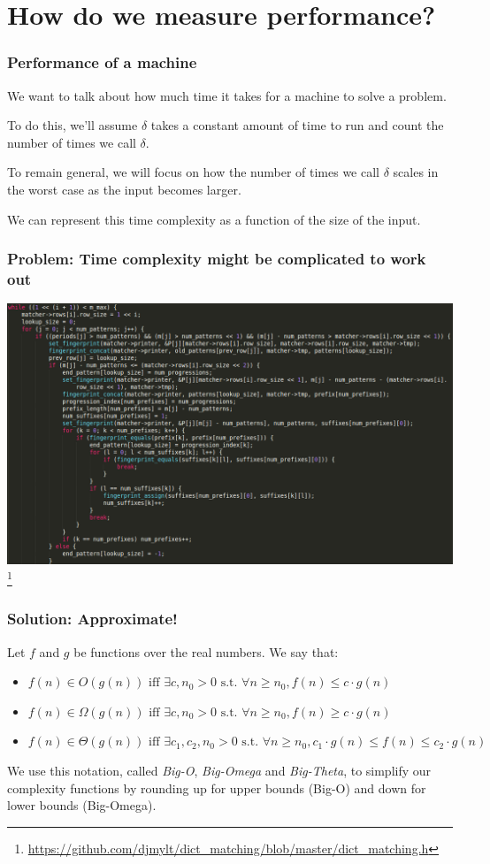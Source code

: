 \documentclass[aspectratio=169]{beamer}
\begin{document}
\section{How do we measure performance?}

\begin{frame}
\frametitle{Performance of a machine}
We want to talk about how much time it takes for a machine to solve a problem.

To do this, we'll assume $\delta$ takes a constant amount of time to run and count the number of times we call $\delta$.

To remain general, we will focus on how the number of times we call $\delta$ scales in the worst case as the input becomes larger.

We can represent this time complexity as a function of the size of the input.
\end{frame}

\begin{frame}
\frametitle{Problem: Time complexity might be complicated to work out}
\includegraphics[scale=0.25]{complex_code}\footnote{\url{https://github.com/djmylt/dict_matching/blob/master/dict_matching.h}}
\end{frame}

\begin{frame}
\frametitle{Solution: Approximate!}
Let $f$ and $g$ be functions over the real numbers. We say that:

\begin{itemize}
\item<1->$f(n) \in O(g(n)) \text{ iff } \exists c, n_0 > 0 \text{ s.t. } \forall n \geq n_0, f(n) \leq c \cdot g(n)$

\item<2->$f(n) \in \Omega(g(n)) \text{ iff } \exists c, n_0 > 0 \text{ s.t. } \forall n \geq n_0, f(n) \geq c \cdot g(n)$

\item<3->$f(n) \in \Theta(g(n)) \text{ iff } \exists c_1, c_2, n_0 > 0 \text{ s.t. } \forall n \geq n_0, c_1 \cdot g(n) \leq f(n) \leq c_2 \cdot g(n)$
\end{itemize}

We use this notation, called {\em Big-O}, {\em Big-Omega} and {\em Big-Theta}, to simplify our complexity functions by rounding up for upper bounds (Big-O) and down for lower bounds (Big-Omega).
\end{frame}
\end{document}
